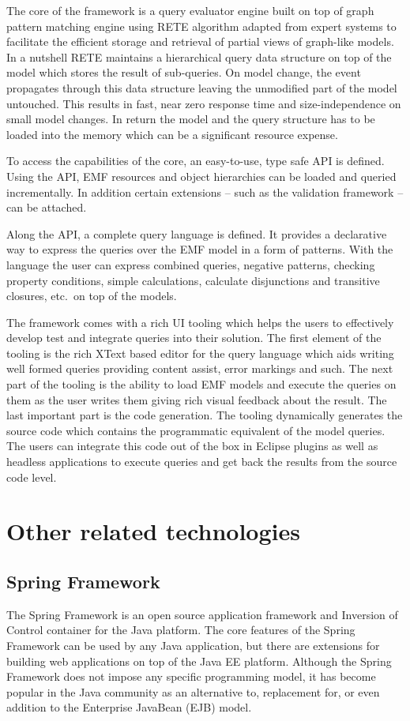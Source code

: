The core of the framework is a query evaluator engine built on top of graph
pattern matching engine using RETE \cite{RETE} algorithm adapted from expert
systems to facilitate the efficient storage and retrieval of partial views of
graph-like models. In a nutshell RETE maintains a hierarchical query data
structure on top of the model which stores the result of sub-queries. On model
change, the event propagates through this data structure leaving the unmodified
part of the model untouched. This results in fast, near zero response time and
size-independence on small model changes. In return the model and the query
structure has to be loaded into the memory which can be a significant resource
expense.

To access the capabilities of the core, an easy-to-use, type safe API is
defined. Using the API, EMF resources and object hierarchies can be loaded and
queried incrementally. In addition certain extensions -- such as the validation
framework -- can be attached.

Along the API, a complete query language is defined. It provides a declarative
way to express the queries over the EMF model in a form of patterns. With the
language the user can express combined queries, negative patterns, checking
property conditions, simple calculations, calculate disjunctions and transitive
closures, etc.~on top of the models.

The framework comes with a rich UI tooling which helps the users to effectively
develop test and integrate queries into their solution. The first element of the
tooling is the rich XText based editor for the query language which aids writing
well formed queries providing content assist, error markings and such. The next
part of the tooling is the ability to load EMF models and execute the queries on
them as the user writes them giving rich visual feedback about the result.
The last important part is the code generation. The tooling dynamically
generates the source code which contains the programmatic equivalent of the
model queries. The users can integrate this code out of the box in Eclipse
plugins as well as headless applications to execute queries and get back the
results from the source code level.

\section{Other related technologies}

\subsection{Spring Framework}
%
The Spring Framework is an open source application framework and Inversion of
Control container for the Java platform. The core features of the Spring
Framework can be used by any Java application, but there are extensions for
building web applications on top of the Java EE platform. Although the Spring
Framework does not impose any specific programming model, it has become popular
in the Java community as an alternative to, replacement for, or even addition to
the Enterprise JavaBean (EJB) model.

